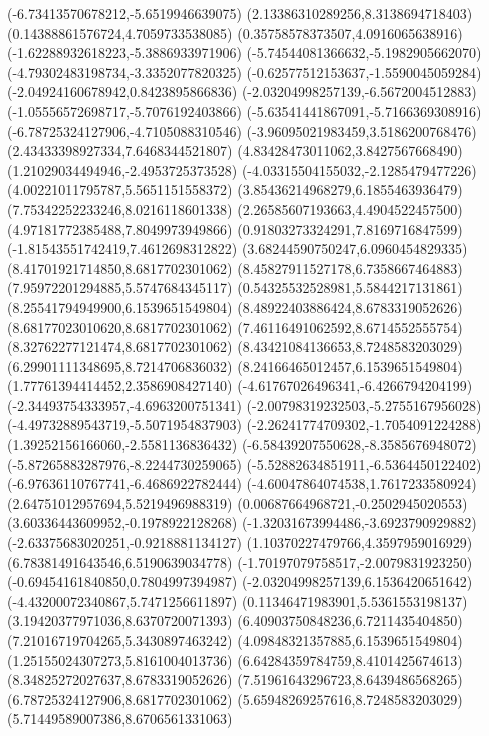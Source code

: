 {(-6.73413570678212,-5.6519946639075)
(2.13386310289256,8.3138694718403)
(0.14388861576724,4.7059733538085)
(0.35758578373507,4.0916065638916)
(-1.62288932618223,-5.3886933971906)
(-5.74544081366632,-5.1982905662070)
(-4.79302483198734,-3.3352077820325)
(-0.62577512153637,-1.5590045059284)
(-2.04924160678942,0.8423895866836)
(-2.03204998257139,-6.5672004512883)
(-1.05556572698717,-5.7076192403866)
(-5.63541441867091,-5.7166369308916)
(-6.78725324127906,-4.7105088310546)
(-3.96095021983459,3.5186200768476)
(2.43433398927334,7.6468344521807)
(4.83428473011062,3.8427567668490)
(1.21029034494946,-2.4953725373528)
(-4.03315504155032,-2.1285479477226)
(4.00221011795787,5.5651151558372)
(3.85436214968279,6.1855463936479)
(7.75342252233246,8.0216118601338)
(2.26585607193663,4.4904522457500)
(4.97181772385488,7.8049973949866)
(0.91803273324291,7.8169716847599)
(-1.81543551742419,7.4612698312822)
(3.68244590750247,6.0960454829335)
(8.41701921714850,8.6817702301062)
(8.45827911527178,6.7358667464883)
(7.95972201294885,5.5747684345117)
(0.54325532528981,5.5844217131861)
(8.25541794949900,6.1539651549804)
(8.48922403886424,8.6783319052626)
(8.68177023010620,8.6817702301062)
(7.46116491062592,8.6714552555754)
(8.32762277121474,8.6817702301062)
(8.43421084136653,8.7248583203029)
(6.29901111348695,8.7214706836032)
(8.24166465012457,6.1539651549804)
(1.77761394414452,2.3586908427140)
(-4.61767026496341,-6.4266794204199)
(-2.34493754333957,-4.6963200751341)
(-2.00798319232503,-5.2755167956028)
(-4.49732889543719,-5.5071954837903)
(-2.26241774709302,-1.7054091224288)
(1.39252156166060,-2.5581136836432)
(-6.58439207550628,-8.3585676948072)
(-5.87265883287976,-8.2244730259065)
(-5.52882634851911,-6.5364450122402)
(-6.97636110767741,-6.4686922782444)
(-4.60047864074538,1.7617233580924)
(2.64751012957694,5.5219496988319)
(0.00687664968721,-0.2502945020553)
(3.60336443609952,-0.1978922128268)
(-1.32031673994486,-3.6923790929882)
(-2.63375683020251,-0.9218881134127)
(1.10370227479766,4.3597959016929)
(6.78381491643546,6.5190639034778)
(-1.70197079758517,-2.0079831923250)
(-0.69454161840850,0.7804997394987)
(-2.03204998257139,6.1536420651642)
(-4.43200072340867,5.7471256611897)
(0.11346471983901,5.5361553198137)
(3.19420377971036,8.6370720071393)
(6.40903750848236,6.7211435404850)
(7.21016719704265,5.3430897463242)
(4.09848321357885,6.1539651549804)
(1.25155024307273,5.8161004013736)
(6.64284359784759,8.4101425674613)
(8.34825272027637,8.6783319052626)
(7.51961643296723,8.6439486568265)
(6.78725324127906,8.6817702301062)
(5.65948269257616,8.7248583203029)
(5.71449589007386,8.6706561331063)
}

